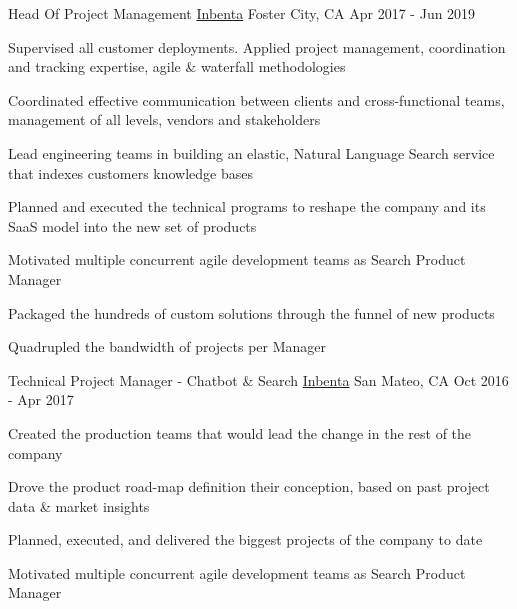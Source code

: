 

\begin{cventries}

  \cventry
    {Head Of Project Management} %
    {\href{https://www.inbenta.com}{Inbenta}} %
    {Foster City, CA} %
    {Apr 2017 - Jun 2019} %
    {
      \begin{cvitems} %
        \item {Supervised all customer deployments. Applied project management, coordination and tracking expertise, agile \& waterfall methodologies}
        \item {Coordinated effective communication between clients and cross-functional teams, management of all levels, vendors and stakeholders}
        \item {Lead engineering teams in building an elastic, Natural Language Search service that indexes customers knowledge bases}
        \item {Planned and executed the technical programs to reshape the company and its SaaS model into the new set of products}
        \item {Motivated multiple concurrent agile development teams as Search Product Manager}
        \item {Packaged the hundreds of custom solutions through the funnel of new products}
        \item {Quadrupled the bandwidth of projects per Manager}
      \end{cvitems}
    }

  \cventry
    {Technical Project Manager - Chatbot \& Search} %
    {\href{https://www.inbenta.com}{Inbenta}} %
    {San Mateo, CA} %
    {Oct 2016 - Apr 2017} %
    {
      \begin{cvitems} %
        \item {Created the production teams that would lead the change in the rest of the company}
        \item {Drove the product road-map definition  their conception, based on past project data \& market insights}
        \item {Planned, executed, and delivered the biggest projects of the company to date}
        \item {Motivated multiple concurrent agile development teams as Search Product Manager}
      \end{cvitems}
    }


\end{cventries}
